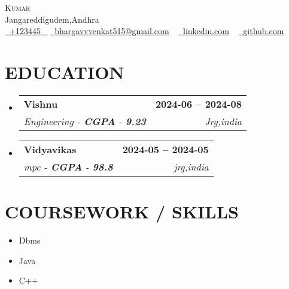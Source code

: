 \documentclass[letterpaper,11pt]{article}
\makeatletter
\newcommand{\resumeSubheading}[4]{
        \vspace{-2pt}\item
          \begin{tabular*}{1.0\textwidth}[t]{l@{\extracolsep{\fill}}r}
            \textbf{\large#1} & \textbf{\small #2} \\
            \textit{\large#3} & \textit{\small #4} \\
            
          \end{tabular*}\vspace{-7pt}
      }
\newcommand{\resumeSubHeadingListStart}{\begin{itemize}[leftmargin=0.0in, label={}]}
\newcommand{\resumeSubHeadingListEnd}{\end{itemize}}
\makeatother
\begin{document}
      
    
        \begin{center}
            {\Huge \scshape Kumar} \\ \vspace{1pt}
            Jangareddigudem,Andhra \\ \vspace{1pt}
            \small \href{tel:+123445}{ \raisebox{-0.1\height}\faPhone\ \underline{+123445} ~} \href{mailto:bhargavvvenkat515@gmail.com}{\raisebox{-0.2\height}\faEnvelope\ \underline{bhargavvvenkat515@gmail.com}} ~ 
            \href{https://linkedin.com}{\raisebox{-0.2\height}\faLinkedinSquare\ \underline{linkedin.com}}  ~
            \href{https://github.com}{\raisebox{-0.2\height}\faGithub\ \underline{github.com}} ~
            \vspace{-8pt}
        \end{center}
    
        \section{EDUCATION}
        \resumeSubHeadingListStart
          
              \resumeSubheading
                {Vishnu}{2024-06 -- 2024-08}
                {Engineering - \textbf{CGPA} - \textbf{9.23}} {Jrg,india}
            
              \resumeSubheading
                {Vidyavikas}{2024-05 -- 2024-05}
                {mpc - \textbf{CGPA} - \textbf{98.8}} {jrg,india}
            
        \resumeSubHeadingListEnd
    
        \section{COURSEWORK / SKILLS}
        \begin{multicols}{4}
            \begin{itemize}[itemsep=-2pt, parsep=5pt]
                
                    \item Dbms
                  
                    \item Java
                  
                    \item C++
                  
            \end{itemize}
        \end{multicols}
        \vspace*{2.0\multicolsep}
    
\end{document}
